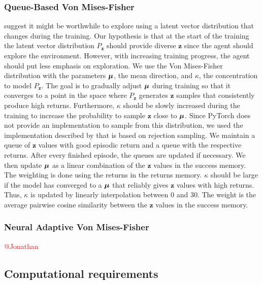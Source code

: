 \documentclass[10pt]{article} %
\begin{document}
\subsubsection{Queue-Based Von Mises-Fisher}
\cite{rle-paper} suggest it might be worthwhile to explore using a latent vector distribution that changes during the training. Our hypothesis is that at the start of the training the latent vector distribution $P_{\textbf{z}}$ should provide diverse $\textbf{z}$ since the agent should explore the environment. However, with increasing training progress, the agent should put less emphasis on exploration. We use the Von Mises-Fisher distribution with the parameters ${\bm{\mu}}$, the mean direction, and $\kappa$, the concentration to model $P_{\textbf{z}}$. The goal is to gradually adjust ${\bm{\mu}}$ during training so that it converges to a point in the space where $P_{\textbf{z}}$ generates $\mathbf{z}$ samples that consistently produce high returns. Furthermore, $\kappa$ should be slowly increased during the training to increase the probability to sample $\mathbf{z}$ close to ${\bm{\mu}}$. Since PyTorch does not provide an implementation to sample from this distribution, we used the implementation described by \cite{von-mises-fisher-paper} that is based on rejection sampling. We maintain a queue of $\textbf{z}$ values with good episodic return and a queue with the respective returns. After every finished episode, the queues are updated if necessary. We then update ${\bm{\mu}}$ as a linear combination of the $\textbf{z}$ values in the success memory. The weighting is done using the returns in the returns memory. $\kappa$ should be large if the model has converged to a ${\bm{\mu}}$ that reliably gives $\textbf{z}$ values with high returns. Thus, $\kappa$ is updated by linearly interpolation between 0 and 30. The weight is the average pairwise cosine similarity between the $\textbf{z}$ values in the success memory.


\subsubsection{Neural Adaptive Von Mises-Fisher}
\textcolor{red}{@Jonathan}


\hypertarget{computational-requirements}{\subsection{Computational requirements}}
\end{document}
